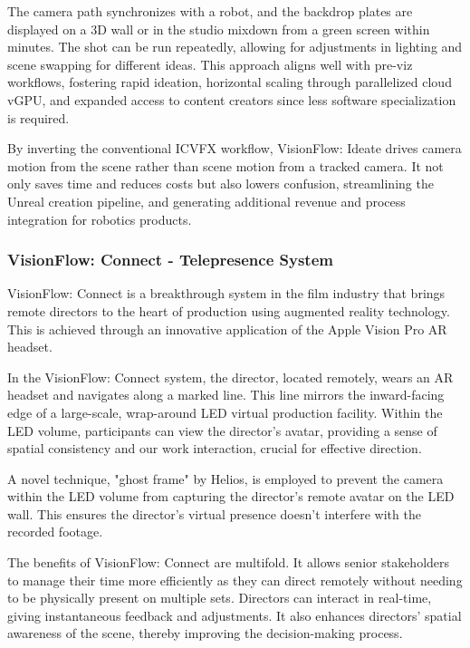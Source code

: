 The camera path synchronizes with a robot, and the backdrop plates are displayed on a 3D wall or in the studio mixdown from a green screen within minutes. The shot can be run repeatedly, allowing for adjustments in lighting and scene swapping for different ideas. This approach aligns well with pre-viz workflows, fostering rapid ideation, horizontal scaling through parallelized cloud vGPU, and expanded access to content creators since less software specialization is required.\par

By inverting the conventional ICVFX workflow, VisionFlow: Ideate drives camera motion from the scene rather than scene motion from a tracked camera. It not only saves time and reduces costs but also lowers confusion, streamlining the Unreal creation pipeline, and generating additional revenue and process integration for robotics products.

\subsubsection{VisionFlow: Connect - Telepresence System}

VisionFlow: Connect is a breakthrough system in the film industry that brings remote directors to the heart of production using augmented reality technology. This is achieved through an innovative application of the Apple Vision Pro AR headset.\par

In the VisionFlow: Connect system, the director, located remotely, wears an AR headset and navigates along a marked line. This line mirrors the inward-facing edge of a large-scale, wrap-around LED virtual production facility. Within the LED volume, participants can view the director's avatar, providing a sense of spatial consistency and our work interaction, crucial for effective direction.\par

A novel technique, "ghost frame" by Helios, is employed to prevent the camera within the LED volume from capturing the director's remote avatar on the LED wall. This ensures the director's virtual presence doesn't interfere with the recorded footage.\par

The benefits of VisionFlow: Connect are multifold. It allows senior stakeholders to manage their time more efficiently as they can direct remotely without needing to be physically present on multiple sets. Directors can interact in real-time, giving instantaneous feedback and adjustments. It also enhances directors' spatial awareness of the scene, thereby improving the decision-making process.


